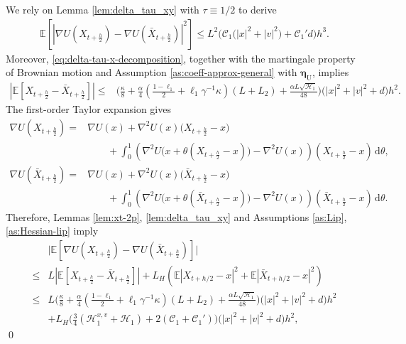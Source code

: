 \documentclass[12pt]{article}
\newenvironment{redtext}
  {\color{black}\ignorespaces}
  {\ignorespacesafterend}
\numberwithin{equation}{section}
\renewenvironment{proof}%
  {\begin{trivlist}%
   \item[]\ignorespaces}%
  {\qed\end{trivlist}}
\newcommand{\E}{\mathbb{E}}
\begin{document}
\begin{redtext}
\begin{proof}
We rely on Lemma \ref{lem:delta_tau_xy} with \(\tau\equiv1/2\) to derive
\begin{align}
\E
\left[
\left|
\nabla U(X_{t+\frac h2})
-
\nabla U(\bar X_{t+\frac h2})
\right|^2
\right]
\leq
L^2
\Big(
\mathcal C_1
\big(
|x|^2+|v|^2
\big)
+
\mathcal C_1'd
\Big)h^3.
\end{align}
Moreover, \eqref{eq:delta-tau-x-decomposition}, together with the
martingale property of Brownian motion and Assumption
\ref{as:coeff-approx-general} with $\boldsymbol{\eta}_\mathrm{U}$, implies
\begin{align}
\left|
\E\left[
X_{t+\frac h2}
-
\bar X_{t+\frac h2}
\right]
\right|
\leq&
\bigg(
\tfrac{\kappa}{8}
+
\tfrac{\alpha}{4}
\left(
\tfrac{1-\ell_1}{2}
+
\ell_1\gamma^{-1}\kappa
\right)
(L+L_2)
+
\tfrac{\alpha L\sqrt{\mathscr H_1}}{48}
\bigg)
\bigl(
|x|^2+|v|^2+d
\bigr)h^2.
\end{align}
The first-order Taylor expansion gives
\begin{align}
\nabla U(X_{t+\frac{h}{2}})
=&
\nabla U(x)
+
\nabla^2 U(x)
\big(X_{t+\frac{h}{2}}-x\big)
\nonumber\\
&\qquad+
\int_0^1
\left(
\nabla^2
U\bigl(x+\theta(X_{t+\frac{h}{2}}-x)\bigr)
-
\nabla^2U(x)
\right)
(X_{t+\frac{h}{2}}-x)\,\mathrm d\theta,
\nonumber\\
\nabla U(\bar X_{t+\frac{h}{2}})
=&
\nabla U(x)
+
\nabla^2 U(x)
\big(\bar X_{t+\frac{h}{2}}-x\big)
\nonumber\\
&\qquad+
\int_0^1
\left(
\nabla^2U
\bigl(x+\theta(\bar X_{t+\frac{h}{2}}-x)\bigr)
-
\nabla^2U(x)
\right)
(\bar X_{t+\frac{h}{2}}-x)\,\mathrm d\theta
.
\end{align}
Therefore, Lemmas \ref{lem:xt-2p}, \ref{lem:delta_tau_xy} and Assumptions
\ref{as:Lip}, \ref{as:Hessian-lip} imply
\begin{align}
&\Big|\E
\left[
\nabla U(X_{t+\frac h2})
-
\nabla U(\bar X_{t+\frac h2})
\right]
\Big|
\nonumber\\
\leq&
L
\left|\E\left[
X_{t+\frac h2}
-
\bar X_{t+\frac h2}
\right]
\right|
+
L_H
\left(
\E|X_{t+h/2}-x|^2
+
\E|\bar X_{t+h/2}-x|^2
\right)
\nonumber\\
\leq&
L
\Big(
\tfrac{\kappa}{8}
+
\tfrac{\alpha}{4}
\left(
\tfrac{1-\ell_1}{2}
+
\ell_1\gamma^{-1}\kappa
\right)
(L+L_2)
+
\tfrac{\alpha L\sqrt{\mathscr H_1}}{48}
\Big)
\bigl(
|x|^2+|v|^2+d
\bigr)h^2
\nonumber\\
&+
L_H
\big(
\tfrac34
\left(
\mathscr H^{x,v}_1+\mathscr H_1
\right)
+
2
\left(
\mathcal C_1+\mathcal C_1'
\right)
\big)
\bigl(
|x|^2+|v|^2+d
\bigr)h^2,

\end{align}
\end{proof}
\end{redtext}
\end{document}
